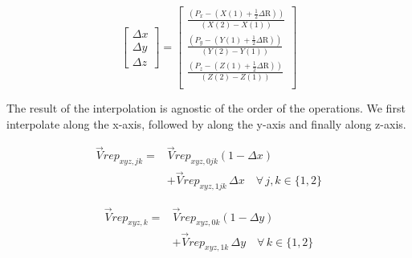 \documentclass[letterpaper, 10 pt, conference]{ieeeconf}  %
\begin{document}
\begin{equation}
	\label{eq: deltas interp}
	\begin{bmatrix}
		\Delta x \\
		\Delta y \\
		\Delta z		
	\end{bmatrix}
	=
	\begin{bmatrix}
		\frac{\left( P_x - \left( X(1) + \frac{1}{2} \Delta \mathrm{R} \right)  \right)}{\left( X(2) - X(1) \right)} \\
		\frac{\left( P_y - \left( Y(1) + \frac{1}{2} \Delta \mathrm{R} \right)  \right)}{\left( Y(2) - Y(1) \right)} \\
		\frac{\left( P_z - \left( Z(1) + \frac{1}{2} \Delta \mathrm{R} \right)  \right)}{\left( Z(2) - Z(1) \right)} \\
	\end{bmatrix}
\end{equation}

The result of the interpolation is agnostic of the order of the operations. We first interpolate along the x-axis, followed by along the y-axis and finally along z-axis.
	

\begin{equation}
\begin{aligned}
	\vec{V}rep_{xyz,jk} = &\vec{V}rep_{xyz,0jk}(1 - \Delta x) \\
	&+ \vec{V}rep_{xyz,1jk} \, \Delta x \quad \forall \, j, k \in \{1, 2\}
\end{aligned}
\end{equation}


\begin{equation}
	\begin{aligned}
		\vec{V}rep_{xyz,k} = &\vec{V}rep_{xyz,0k}(1 - \Delta y) \\
		&+ \vec{V}rep_{xyz,1k} \, \Delta y \quad \forall \, k \in \{1, 2\}
	\end{aligned}
\end{equation}
\end{document}
